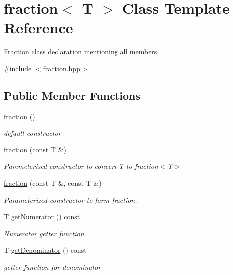 \hypertarget{classfraction}{}\section{fraction$<$ T $>$ Class Template Reference}
\label{classfraction}


Fraction class declaration mentioning all members.  




{\ttfamily \#include $<$fraction.\+hpp$>$}

\subsection*{Public Member Functions}
\begin{DoxyCompactItemize}
\item 
\hyperlink{classfraction_a06d1282041ed142bcd60954d574d27c9}{fraction} ()
\begin{DoxyCompactList}\small\item\em default constructor \end{DoxyCompactList}\item 
\hyperlink{classfraction_a5680969378119101e335765e1f61d135}{fraction} (const T \&)
\begin{DoxyCompactList}\small\item\em Paremeterised constructor to convert T to fraction$<$\+T$>$ \end{DoxyCompactList}\item 
\hyperlink{classfraction_a3d993a9a34b792cc9ff5c6580efd1c69}{fraction} (const T \&, const T \&)
\begin{DoxyCompactList}\small\item\em Parameterized constructor to form fraction. \end{DoxyCompactList}\item 
T \hyperlink{classfraction_ab2c71b6d8a1fe8cc38fca27557c8af9e}{get\+Numerator} () const 
\begin{DoxyCompactList}\small\item\em Numerator getter function. \end{DoxyCompactList}\item 
T \hyperlink{classfraction_a99611e6e50d2527d0b19c786995f401f}{get\+Denominator} () const 
\begin{DoxyCompactList}\small\item\em getter function for denominator \end{DoxyCompactList}\item 

\end{DoxyCompactItemize}
